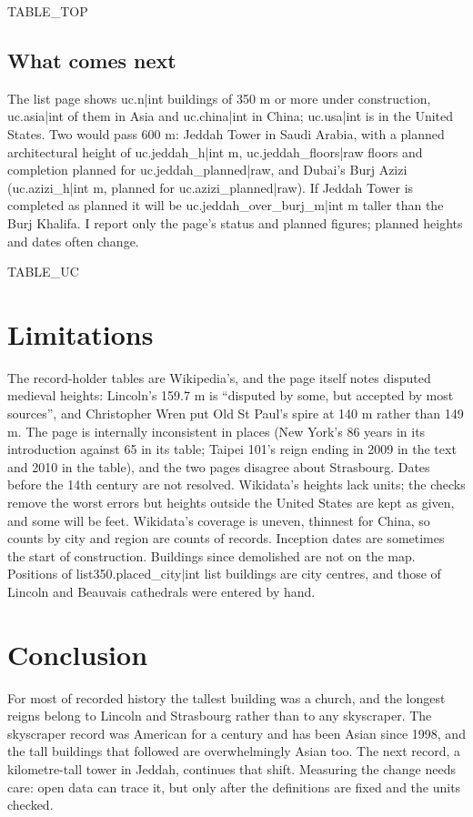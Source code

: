 \documentclass[11pt,a4paper]{article}
\begin{document}
{{TABLE_TOP}}

\subsection{What comes next}
The list page shows {{uc.n|int}} buildings of 350 m or more under construction, {{uc.asia|int}} of them in Asia and {{uc.china|int}} in China; {{uc.usa|int}} is in the United States. Two would pass 600 m: Jeddah Tower in Saudi Arabia, with a planned architectural height of {{uc.jeddah_h|int}} m, {{uc.jeddah_floors|raw}} floors and completion planned for {{uc.jeddah_planned|raw}}, and Dubai's Burj Azizi ({{uc.azizi_h|int}} m, planned for {{uc.azizi_planned|raw}}). If Jeddah Tower is completed as planned it will be {{uc.jeddah_over_burj_m|int}} m taller than the Burj Khalifa. I report only the page's status and planned figures; planned heights and dates often change.

{{TABLE_UC}}

\section{Limitations}
The record-holder tables are Wikipedia's, and the page itself notes disputed medieval heights: Lincoln's 159.7 m is ``disputed by some, but accepted by most sources'', and Christopher Wren put Old St Paul's spire at 140 m rather than 149 m. The page is internally inconsistent in places (New York's 86 years in its introduction against 65 in its table; Taipei 101's reign ending in 2009 in the text and 2010 in the table), and the two pages disagree about Strasbourg. Dates before the 14th century are not resolved. Wikidata's heights lack units; the checks remove the worst errors but heights outside the United States are kept as given, and some will be feet. Wikidata's coverage is uneven, thinnest for China, so counts by city and region are counts of records. Inception dates are sometimes the start of construction. Buildings since demolished are not on the map. Positions of {{list350.placed_city|int}} list buildings are city centres, and those of Lincoln and Beauvais cathedrals were entered by hand.

\section{Conclusion}
For most of recorded history the tallest building was a church, and the longest reigns belong to Lincoln and Strasbourg rather than to any skyscraper. The skyscraper record was American for a century and has been Asian since 1998, and the tall buildings that followed are overwhelmingly Asian too. The next record, a kilometre-tall tower in Jeddah, continues that shift. Measuring the change needs care: open data can trace it, but only after the definitions are fixed and the units checked.
\end{document}
